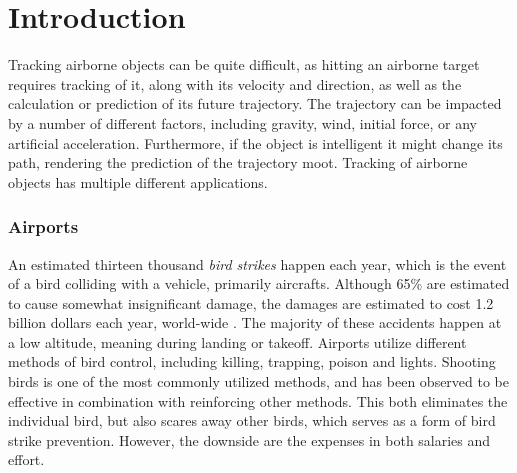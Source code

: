 
\chapter{Introduction}
Tracking airborne objects can be quite difficult, as hitting an airborne target requires tracking of it, along with its velocity and direction, as well as the calculation or prediction of its future trajectory.
The trajectory can be impacted by a number of different factors, including gravity, wind, initial force, or any artificial acceleration.
Furthermore, if the object is intelligent it might change its path, rendering the prediction of the trajectory moot.
Tracking of airborne objects has multiple different applications.

\subsection{Airports}
An estimated thirteen thousand \textit{bird strikes} happen each year, which is the event of a bird colliding with a vehicle, primarily aircrafts\cite{WildlifeStrikeReport}.
Although 65\% are estimated to cause somewhat insignificant damage, the damages are estimated to cost 1.2 billion dollars each year, world-wide \cite{CostOfBirdstrikes}.
The majority of these accidents happen at a low altitude, meaning during landing or takeoff\cite{CostOfBirdstrikes}.
Airports utilize different methods of bird control, including killing, trapping, poison and lights\cite{BirdControlAtAirports}.
Shooting birds is one of the most commonly utilized methods, and has been observed to be effective in combination with reinforcing other methods.
This both eliminates the individual bird, but also scares away other birds, which serves as a form of bird strike prevention.
However, the downside are the expenses in both salaries and effort.

